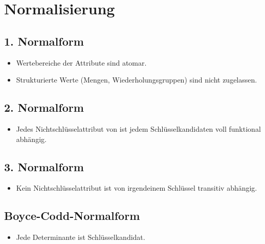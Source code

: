 \section{Normalisierung}
\begin{multicols}{2}
\subsection{1. Normalform}
\begin{itemize}
\setlength{\itemsep}{0pt}  
  \item Wertebereiche der Attribute sind atomar.
  \item Strukturierte Werte (Mengen, Wiederholungsgruppen) sind nicht zugelassen.
\end{itemize}

\subsection{2. Normalform}
\begin{itemize}
\setlength{\itemsep}{0pt}
  \item Jedes Nichtschlüsselattribut von ist jedem Schlüsselkandidaten voll funktional abhängig.
\end{itemize}

\subsection{3. Normalform}
\begin{itemize}
\setlength{\itemsep}{0pt}
  \item Kein Nichtschlüsselattribut ist von irgendeinem Schlüssel transitiv abhängig.
\end{itemize}

\subsection{Boyce-Codd-Normalform}
\begin{itemize}
\setlength{\itemsep}{0pt}
  \item Jede Determinante ist Schlüsselkandidat.
\end{itemize}
\end{multicols}